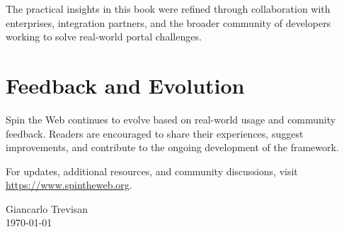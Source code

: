 The practical insights in this book were refined through collaboration with enterprises, integration partners, and the broader community of developers working to solve real-world portal challenges.

\section*{Feedback and Evolution}

Spin the Web continues to evolve based on real-world usage and community feedback. Readers are encouraged to share their experiences, suggest improvements, and contribute to the ongoing development of the framework.

For updates, additional resources, and community discussions, visit \url{https://www.spintheweb.org}.

\vspace{1cm}
\hfill Giancarlo Trevisan \\
\hfill \today

\clearpage
